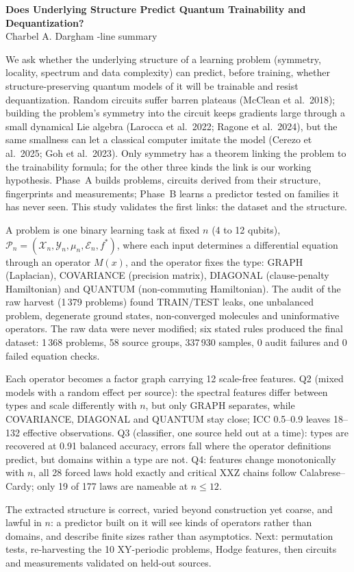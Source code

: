 \documentclass[10pt,a4paper]{article}
\begin{document}
\begin{center}
{\large\bfseries Does Underlying Structure Predict Quantum Trainability and Dequantization?}\\[0.4ex]
Charbel A. Dargham \quad\textperiodcentered{}-line summary
\end{center}

We ask whether the underlying structure of a learning problem (symmetry, locality, spectrum and data
complexity) can predict, before training, whether structure-preserving quantum models of it will be
trainable and resist dequantization. Random circuits suffer barren plateaus (McClean et al.\ 2018);
building the problem's symmetry into the circuit keeps gradients large through a small dynamical Lie
algebra (Larocca et al.\ 2022; Ragone et al.\ 2024), but the same smallness can let a classical computer
imitate the model (Cerezo et al.\ 2025; Goh et al.\ 2023). Only symmetry has a theorem linking the problem
to the trainability formula; for the other three kinds the link is our working hypothesis. Phase~A builds
problems, circuits derived from their structure, fingerprints and measurements; Phase~B learns a predictor
tested on families it has never seen. This study validates the first links: the dataset and the structure.

A problem is one binary learning task at fixed $n$ (4 to 12 qubits),
$\mathcal{P}_n=(\mathcal{X}_n,\mathcal{Y}_n,\mu_n,\mathcal{E}_n,f^{*})$, where each input determines a
differential equation through an operator $M(x)$, and the operator fixes the type: GRAPH (Laplacian),
COVARIANCE (precision matrix), DIAGONAL (clause-penalty Hamiltonian) and QUANTUM (non-commuting
Hamiltonian). The audit of the raw harvest (1\,379 problems) found TRAIN/TEST leaks, one unbalanced problem,
degenerate ground states, non-converged molecules and uninformative operators. The raw data were never
modified; six stated rules produced the final dataset: 1\,368 problems, 58 source groups, 337\,930 samples,
0 audit failures and 0 failed equation checks.

Each operator becomes a factor graph carrying 12 scale-free features. Q2 (mixed models
with a random effect per source): the spectral features differ between types and scale differently with $n$,
but only GRAPH separates, while COVARIANCE, DIAGONAL and QUANTUM stay close; ICC 0.5--0.9 leaves
18--132 effective observations. Q3 (classifier, one source held out at a time): types are recovered at 0.91
balanced accuracy, errors fall where the operator definitions predict, but domains within a type are not.
Q4: features change monotonically with $n$, all 28 forced laws hold exactly and critical XXZ chains follow
Calabrese--Cardy; only 19 of 177 laws are nameable at $n\le 12$.

The extracted structure is correct, varied beyond construction yet coarse, and lawful in $n$: a predictor built
on it will see kinds of operators rather than domains, and describe finite sizes rather than asymptotics. Next:
permutation tests, re-harvesting the 10 XY-periodic problems, Hodge features, then circuits and
measurements validated on held-out sources.
\end{document}
